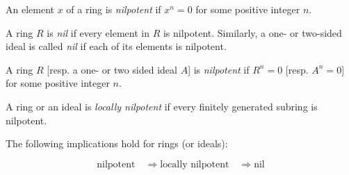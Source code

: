 \documentclass[12pt]{article}
\begin{document}
An element $x$ of a ring is \emph{nilpotent} if $x^n = 0$ for some positive integer $n$.

A ring $R$ is \emph{nil} if every element in $R$ is nilpotent.  Similarly, a one- or two-sided ideal is called \emph{nil} if each of its elements is nilpotent.

A ring $R$ [resp. a one- or two sided ideal $A$] is \emph{nilpotent} if $R^n = 0$ [resp. $A^n = 0$] for some positive integer $n$.

A ring or an ideal is \emph{locally nilpotent} if every finitely generated subring is nilpotent.

The following implications hold for rings (or ideals):

$$\text{nilpotent} \quad\Rightarrow \text{locally nilpotent} \quad\Rightarrow \text{nil}$$
\end{document}
